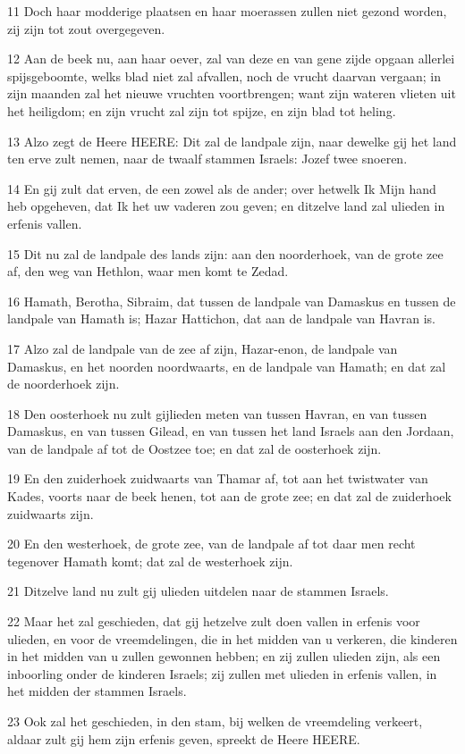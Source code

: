 \par 11 Doch haar modderige plaatsen en haar moerassen zullen niet gezond worden, zij zijn tot zout overgegeven.
\par 12 Aan de beek nu, aan haar oever, zal van deze en van gene zijde opgaan allerlei spijsgeboomte, welks blad niet zal afvallen, noch de vrucht daarvan vergaan; in zijn maanden zal het nieuwe vruchten voortbrengen; want zijn wateren vlieten uit het heiligdom; en zijn vrucht zal zijn tot spijze, en zijn blad tot heling.
\par 13 Alzo zegt de Heere HEERE: Dit zal de landpale zijn, naar dewelke gij het land ten erve zult nemen, naar de twaalf stammen Israels: Jozef twee snoeren.
\par 14 En gij zult dat erven, de een zowel als de ander; over hetwelk Ik Mijn hand heb opgeheven, dat Ik het uw vaderen zou geven; en ditzelve land zal ulieden in erfenis vallen.
\par 15 Dit nu zal de landpale des lands zijn: aan den noorderhoek, van de grote zee af, den weg van Hethlon, waar men komt te Zedad.
\par 16 Hamath, Berotha, Sibraim, dat tussen de landpale van Damaskus en tussen de landpale van Hamath is; Hazar Hattichon, dat aan de landpale van Havran is.
\par 17 Alzo zal de landpale van de zee af zijn, Hazar-enon, de landpale van Damaskus, en het noorden noordwaarts, en de landpale van Hamath; en dat zal de noorderhoek zijn.
\par 18 Den oosterhoek nu zult gijlieden meten van tussen Havran, en van tussen Damaskus, en van tussen Gilead, en van tussen het land Israels aan den Jordaan, van de landpale af tot de Oostzee toe; en dat zal de oosterhoek zijn.
\par 19 En den zuiderhoek zuidwaarts van Thamar af, tot aan het twistwater van Kades, voorts naar de beek henen, tot aan de grote zee; en dat zal de zuiderhoek zuidwaarts zijn.
\par 20 En den westerhoek, de grote zee, van de landpale af tot daar men recht tegenover Hamath komt; dat zal de westerhoek zijn.
\par 21 Ditzelve land nu zult gij ulieden uitdelen naar de stammen Israels.
\par 22 Maar het zal geschieden, dat gij hetzelve zult doen vallen in erfenis voor ulieden, en voor de vreemdelingen, die in het midden van u verkeren, die kinderen in het midden van u zullen gewonnen hebben; en zij zullen ulieden zijn, als een inboorling onder de kinderen Israels; zij zullen met ulieden in erfenis vallen, in het midden der stammen Israels.
\par 23 Ook zal het geschieden, in den stam, bij welken de vreemdeling verkeert, aldaar zult gij hem zijn erfenis geven, spreekt de Heere HEERE.

